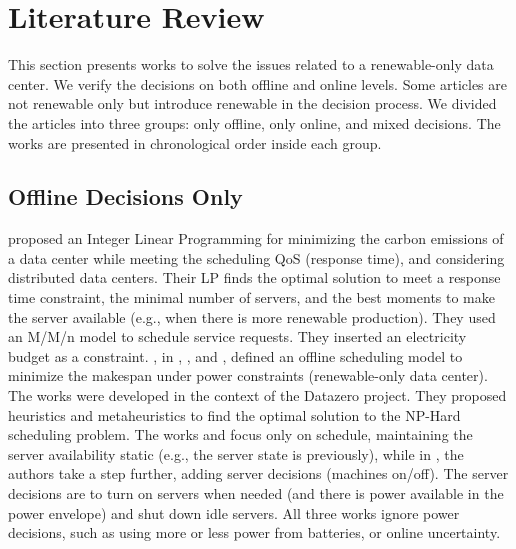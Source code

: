 \section{Literature Review}
This section presents works to solve the issues related to a renewable-only data center. We verify the decisions on both offline and online levels. Some articles are not renewable only but introduce renewable in the decision process. We divided the articles into three groups: only offline, only online, and mixed decisions. The works are presented in chronological order inside each group.

\subsection{Offline Decisions Only}
\citeauthor{gu2015green} \cite{gu2015green} proposed an Integer Linear Programming for minimizing the carbon emissions of a data center while meeting the scheduling QoS (response time), and considering distributed data centers. Their LP finds the optimal solution to meet a response time constraint, the minimal number of servers, and the best moments to make the server available (e.g., when there is more renewable production). They used an M/M/n model to schedule service requests. They inserted an electricity budget as a constraint. \citeauthor{kassab2017scheduling}, in \cite{kassab2017scheduling}, \cite{kassab2018assessing}, and \cite{kassab2019green}, defined an offline scheduling model to minimize the makespan under power constraints (renewable-only data center). The works were developed in the context of the Datazero project. They proposed heuristics and metaheuristics to find the optimal solution to the NP-Hard scheduling problem. The works \cite{kassab2017scheduling} and \cite{kassab2018assessing} focus only on schedule, maintaining the server availability static (e.g., the server state is previously), while in \cite{kassab2019green}, the authors take a step further, adding server decisions (machines on/off). The server decisions are to turn on servers when needed (and there is power available in the power envelope) and shut down idle servers. All three works ignore power decisions, such as using more or less power from batteries, or online uncertainty.

